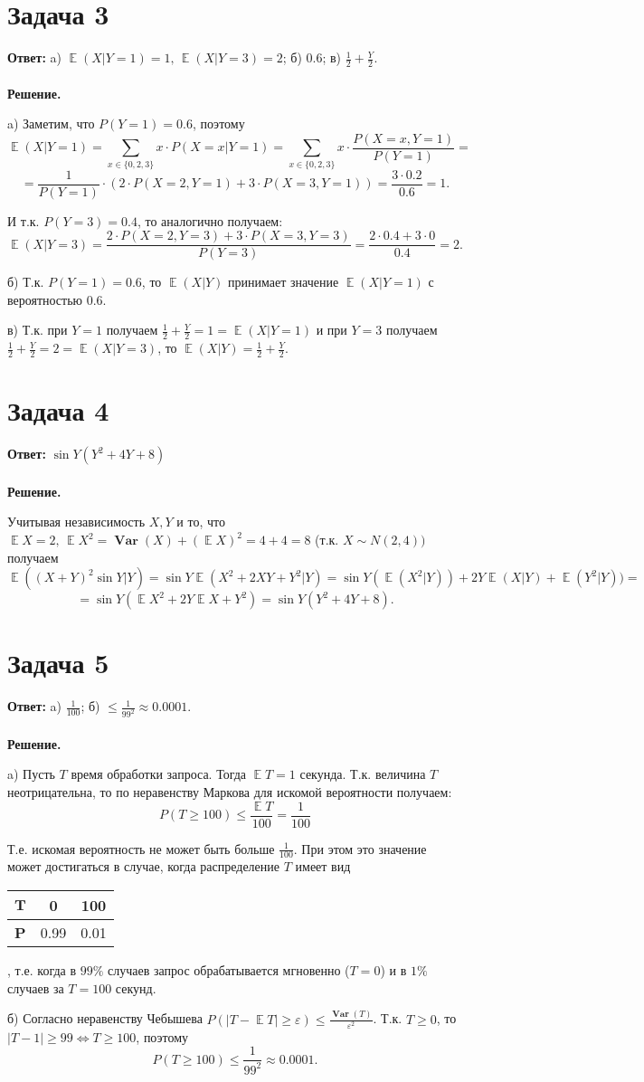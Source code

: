 \documentclass{article}
\DeclareMathOperator{\Var}{\textbf{Var}}
\DeclareMathOperator{\EX}{\mathbb{E}}
\begin{document}
\section*{Задача 3}
{\bf Ответ: } a) $\EX(X|Y=1)=1,\,\EX(X|Y=3)=2$; б) 0.6; в) $\frac{1}{2} + \frac{Y}{2}$.
\\
\\
{\bf Решение.}
\par
a) Заметим, что $P(Y=1)=0.6$, поэтому $$\EX(X|Y=1)=\sum\limits_{x\in\{0,2,3\}}x\cdot P(X=x|Y=1) = \sum\limits_{x\in\{0,2,3\}}x\cdot\frac{P(X=x,Y=1)}{P(Y=1)}=$$
$$=\frac{1}{P(Y=1)}\cdot\left(2\cdot{P(X=2,Y=1)}+3\cdot{P(X=3,Y=1)}\right)=\frac{3\cdot 0.2}{0.6}=1.$$
\par
И т.к. $P(Y=3)=0.4$, то аналогично получаем:
$$\EX(X|Y=3)=\frac{2\cdot P(X=2,Y=3)+3\cdot P(X=3,Y=3)}{P(Y=3)}=\frac{2\cdot 0.4 + 3\cdot 0}{0.4}=2.$$
\par
б) Т.к. $P(Y=1)=0.6$, то $\EX(X|Y)$ принимает значение $\EX(X|Y=1)$ с вероятностью 0.6.
\par
в) Т.к. при $Y=1$ получаем $\frac{1}{2}+\frac{Y}{2}=1=\EX(X|Y=1)$ и при $Y=3$ получаем $\frac{1}{2}+\frac{Y}{2}=2=\EX(X|Y=3)$, то $\EX(X|Y)=\frac{1}{2}+\frac{Y}{2}$.
\section*{Задача 4}
{\bf Ответ: } $\sin Y(Y^2+4Y+8)$
\\
\\
{\bf Решение.}
\par
Учитывая независимость $X,Y$ и то, что $\EX X=2,\,\EX X^2=\Var(X)+(\EX X)^2=4+4=8$ (т.к. $X\sim N(2,4))$ получаем $$\EX((X+Y)^2\sin Y | Y)=\sin Y\EX(X^2+2XY+Y^2|Y)=\sin Y(\EX(X^2|Y))+2Y\EX(X|Y)+\EX(Y^2|Y))=$$
$$=\sin Y (\EX X^2+2Y\EX X + Y^2)=\sin Y(Y^2+4Y+8).$$
\section*{Задача 5}
{\bf Ответ: } a) $\frac{1}{100}$; б) $\leq \frac{1}{99^2}\approx0.0001$.
\\
\\
{\bf Решение.}
\par
a) Пусть $T$ время обработки запроса. Тогда $\EX T=1$ секунда. Т.к. величина $T$ неотрицательна, то по неравенству Маркова для искомой вероятности получаем:
$$P(T\geq 100)\leq\frac{\EX T}{100}=\frac{1}{100}$$
\par
Т.е. искомая вероятность не может быть больше $\frac{1}{100}$. При этом это значение может достигаться в случае, когда распределение $T$ имеет вид \begin{tabular}{|c|c|c|}\hline$\textbf{T}$ & 0 & 100\\\hline\textbf{P} & 0.99 & 0.01\\\hline\end{tabular}, т.е. когда в $99\%$ случаев запрос обрабатывается мгновенно ($T=0$) и в $1\%$ случаев за $T=100$ секунд.
\par
б) Согласно неравенству Чебышева $P(|T-\EX T|\geq \varepsilon)\leq \frac{\Var(T)}{\varepsilon^2}$. Т.к. $T \geq 0$, то $|T-1|\geq99\Leftrightarrow T \geq 100$, поэтому
$$P(T\geq 100)\leq\frac{1}{99^2}\approx0.0001.$$
\end{document}
